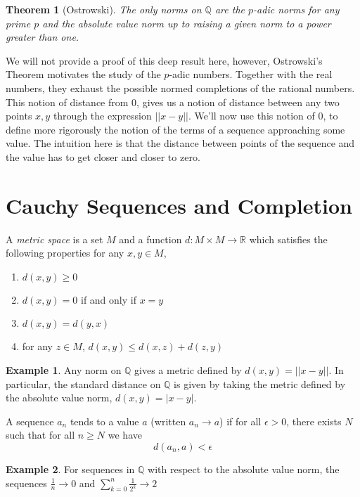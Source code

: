 \documentclass{article}
\newcommand{\Q}{\mathbb{Q}}
\newcommand{\R}{\mathbb{R}}
\newenvironment{definition}[1][Definition:]{\begin{trivlist}
\item[\hskip \labelsep {\bfseries #1}]}{\end{trivlist}}
\theoremstyle{theorem}
\newtheorem{theorem}{Theorem}[section]
\theoremstyle{definition}
\theoremstyle{definition}
\theoremstyle{remark}
\theoremstyle{definition}
\newtheorem{example}{Example}[section]
\theoremstyle{remark}
\begin{document}
\begin{theorem}[Ostrowski]
The only norms on $\Q$ are the $p$-adic norms for any prime $p$ and the absolute value norm up to raising a given norm to a power greater than one.
\end{theorem}
\noindent
We will not provide a proof of this deep result here, however, Ostrowski's Theorem motivates the study of the $p$-adic numbers. Together with the real numbers, they exhaust the possible normed completions of the rational numbers. \bigskip  \\
This notion of distance from 0, gives us a notion of distance between any two points $x,y$ through the expression $||x - y||$. We'll now use this notion of 0, to define more rigorously the notion of the terms of a sequence approaching some value. The intuition here is that the distance between points of the sequence and the value has to get closer and closer to zero.


\section{Cauchy Sequences and Completion} 
\begin{definition}
A \textit{metric space} is a set $M$ and a function $d : M \times M \to \R$ which satisfies the following properties for any $x,y \in M$,
\begin{enumerate}
\item $d(x,y) \ge 0$
\item $d(x, y) = 0$ if and only if $x = y$
\item $d(x, y) = d(y, x)$
\item for any $z \in M$, $d(x,y) \le d(x,z) +  d(z,y)$
\end{enumerate}
\end{definition} 

\begin{example} 
Any norm on $\Q$ gives a metric defined by $d(x, y) = ||x - y||$. In particular, the standard distance on $\Q$ is given by taking the metric defined by the absolute value norm, $d(x, y) = |x - y|$. 
\end{example}

\begin{definition}
A sequence $a_n$ tends to a value $a$ (written $a_n \to a$) if for all $\epsilon > 0$, there exists $N$ such that for all $n \ge N$ we have
\[d(a_n, a) < \epsilon\]
\end{definition}
\begin{example}
For sequences in $\Q$ with respect to the absolute value norm, the sequences $\frac{1}{n} \to 0$ and $\sum\limits_{k = 0}^{n} \frac{1}{2^k} \to 2$
\end{example}
\end{document}
